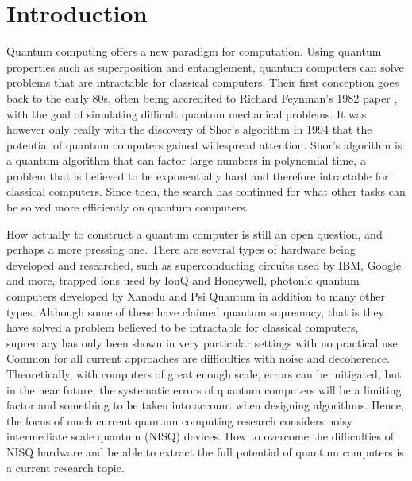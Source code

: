 \chapter{Introduction}
Quantum computing offers a new paradigm for computation.
Using quantum properties such as superposition and entanglement, quantum computers can solve problems that are intractable for classical computers.
Their first conception goes back to the early 80s, often being accredited to Richard Feynman's 1982 paper \cite{feynman}, with the goal of simulating difficult quantum mechanical problems.
It was however only really with the discovery of Shor's algorithm in 1994 \cite{shor} that the potential of quantum computers gained widespread attention.
Shor's algorithm is a quantum algorithm that can factor large numbers in polynomial time, a problem that is believed to be exponentially hard and therefore intractable for classical computers.
Since then, the search has continued for what other tasks can be solved more efficiently on quantum computers.

How actually to construct a quantum computer is still an open question, and perhaps a more pressing one.
There are several types of hardware being developed and researched, such as superconducting circuits used by IBM, Google and more, trapped ions used by IonQ and Honeywell, photonic quantum computers developed by Xanadu and Psi Quantum in addition to many other types.
Although some of these have claimed quantum supremacy, that is they have solved a problem believed to be intractable for classical computers, supremacy has only been shown in very particular settings with no practical use.
Common for all current approaches are difficulties with noise and decoherence.
Theoretically, with computers of great enough scale, errors can be mitigated, but in the near future, the systematic errors of quantum computers will be a limiting factor and something to be taken into account when designing algorithms.
Hence, the focus of much current quantum computing research considers noisy intermediate scale quantum (NISQ) devices.
How to overcome the difficulties of NISQ hardware and be able to extract the full potential of quantum computers is a current research topic.

